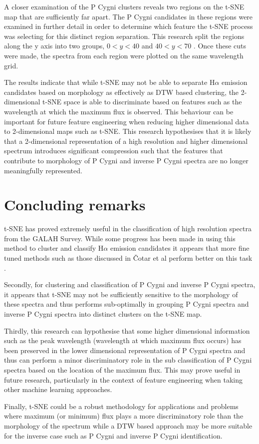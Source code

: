 A closer examination of the P Cygni clusters reveals two regions on the t-SNE map that are sufficiently far apart. The P Cygni candidates in these regions were examined in further detail in order to determine which feature the t-SNE process was selecting for this distinct region separation. This research split the regions along the y axis into two groups, $0<y<40$ and $40<y<70$ . Once these cuts were made, the spectra from each region were plotted on the same wavelength grid. 

The results indicate that while t-SNE may not be able to separate H$\alpha$ emission candidates based on morphology as effectively as DTW based clustering, the 2-dimensional t-SNE space is able to discriminate based on features such as the wavelength at which the maximum flux is observed. This behaviour can be important for future feature engineering when reducing higher dimensional data to 2-dimensional maps such as t-SNE. This research hypothesises that it is likely that a 2-dimensional representation of a high resolution and higher dimensional spectrum introduces significant compression such that the features that contribute to morphology of P Cygni and inverse P Cygni spectra are no longer meaningfully represented.

\section{Concluding remarks}

t-SNE has proved extremely useful in the classification of high resolution spectra from the GALAH Survey. While some progress has been made in using this method to cluster and classify H$\alpha$ emission candidates \cite{traven2017galah} it appears that more fine tuned methods such as those discussed in Čotar et al perform better on this task \cite{vcotar2021galah}.

Secondly, for clustering and classification of P Cygni and inverse P Cygni spectra, it appears that t-SNE may not be sufficiently sensitive to the morphology of these spectra and thus performs sub-optimally in grouping P Cygni spectra and inverse P Cygni spectra into distinct clusters on the t-SNE map. 

Thirdly, this research can hypothesise that some higher dimensional information such as the peak wavelength (wavelength at which maximum flux occurs) has been preserved in the lower dimensional representation of P Cygni spectra and thus can perform a minor discriminatory role in the sub classification of P Cygni spectra based on the location of the maximum flux. This may prove useful in future research, particularly in the context of feature engineering when taking other machine learning approaches. 

Finally, t-SNE could be a robust methodology for applications and problems where maximum (or minimum) flux plays a more discriminatory role than the morphology of the spectrum while a DTW based approach may be more suitable for the inverse case such as P Cygni and inverse P Cygni identification.

